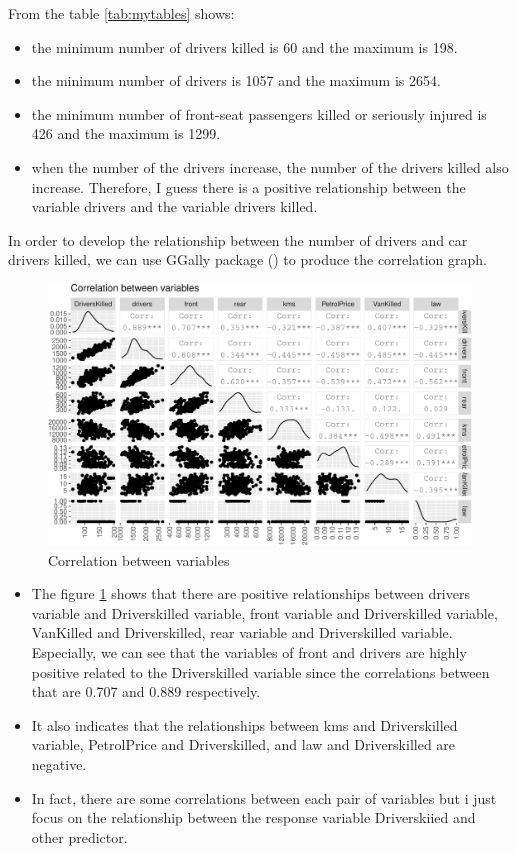 \documentclass[11pt,a4paper,]{article}
\begin{document}
From the table \ref{tab:mytables} shows:

\begin{itemize}
\item
  the minimum number of drivers killed is 60 and the maximum is 198.
\item
  the minimum number of drivers is 1057 and the maximum is 2654.
\item
  the minimum number of front-seat passengers killed or seriously injured is 426 and the maximum is 1299.
\item
  when the number of the drivers increase, the number of the drivers killed also increase. Therefore, I guess there is a positive relationship between the variable drivers and the variable drivers killed.
\end{itemize}

In order to develop the relationship between the number of drivers and car drivers killed, we can use GGally package (\cite{10}) to produce the correlation graph.

\begin{figure}[H]

{\centering \includegraphics{report_files/figure-latex/myggpair-1} 

}

\caption{Correlation between variables}\label{fig:myggpair}
\end{figure}

\begin{itemize}
\item
  The figure \ref{fig:myggpair} shows that there are positive relationships between drivers variable and Driverskilled variable, front variable and Driverskilled variable, VanKilled and Driverskilled, rear variable and Driverskilled variable. Especially, we can see that the variables of front and drivers are highly positive related to the Driverskilled variable since the correlations between that are 0.707 and 0.889 respectively.
\item
  It also indicates that the relationships between kms and Driverskilled variable, PetrolPrice and Driverskilled, and law and Driverskilled are negative.
\item
  In fact, there are some correlations between each pair of variables but i just focus on the relationship between the response variable Driverskiied and other predictor.
\end{itemize}
\end{document}
